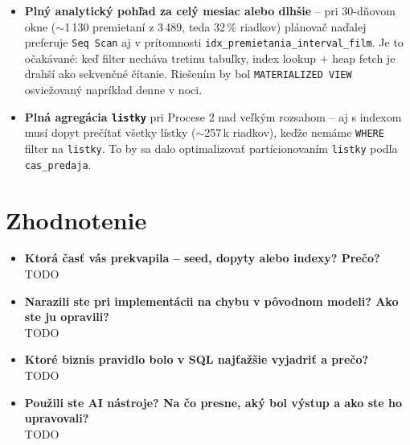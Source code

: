 \documentclass[11pt, a4paper]{article}
\begin{document}
\begin{itemize}
    \item \textbf{Plný analytický pohľad za celý mesiac alebo dlhšie}
    -- pri 30-dňovom okne ($\sim$1\,130 premietaní z 3\,489, teda
    32\,\% riadkov) plánovač naďalej preferuje \texttt{Seq Scan} aj
    v prítomnosti \texttt{idx\_premietania\_interval\_film}.
    Je to očakávané: keď filter necháva tretinu tabuľky, index lookup
    + heap fetch je drahší ako sekvenčné čítanie.
    Riešením by bol \texttt{MATERIALIZED VIEW} osviežovaný napríklad
    denne v noci.

    \item \textbf{Plná agregácia \texttt{listky}} pri Procese 2 nad
    veľkým rozsahom -- aj s indexom musí dopyt prečítať všetky lístky
    ($\sim$257\,k riadkov), keďže nemáme \texttt{WHERE} filter na
    \texttt{listky}. To by sa dalo optimalizovať partícionovaním
    \texttt{listky} podľa \texttt{cas\_predaja}.
\end{itemize}

\newpage
\section{Zhodnotenie}
\label{sec:zhodnotenie}

\begin{itemize}
    \item \textbf{Ktorá časť vás prekvapila -- seed, dopyty alebo indexy?
    Prečo?} \\
    TODO

    \item \textbf{Narazili ste pri implementácii na chybu v pôvodnom modeli?
    Ako ste ju opravili?} \\
    TODO

    \item \textbf{Ktoré biznis pravidlo bolo v SQL najťažšie vyjadriť a prečo?} \\
    TODO

    \item \textbf{Použili ste AI nástroje? Na čo presne, aký bol výstup
    a ako ste ho upravovali?} \\
    TODO
\end{itemize}

\printbibliography
\end{document}
